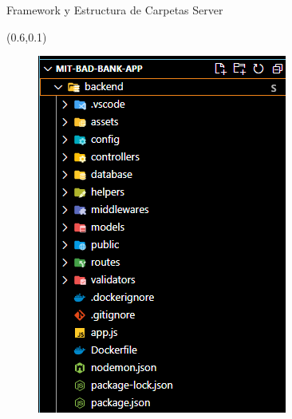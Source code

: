 \documentclass[xcolor=pdftex,dvipsnames,table]{beamer}
\begin{document}
\begin{frame}{Framework y Estructura de Carpetas Server}
    
    \begin{textblock*}{0.5\textwidth}(0.6\textwidth,0.1\textwidth)
        \begin{figure}
            \centering
            \includegraphics[width=0.75\linewidth]{back/sub.png}
            \label{fig:my_label}
        \end{figure}
    \end{textblock*}
\end{frame}
\end{document}
